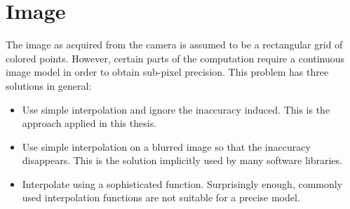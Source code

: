 \section{Image}
The image as acquired from the camera is assumed to be a rectangular grid of colored points.
However, certain parts of the computation require a continuous image model in order to obtain sub-pixel precision.
This problem has three solutions in general:

\begin{itemize}
\item Use simple interpolation and ignore the inaccuracy induced.
This is the approach applied in this thesis.

\item Use simple interpolation on a blurred image so that the inaccuracy disappears.
This is the solution implicitly used by many software libraries.

\item Interpolate using a sophisticated function.
Surprisingly enough, commonly used interpolation functions are not suitable for a precise model.

\end{itemize}

